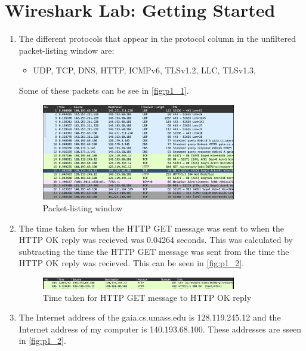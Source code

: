 \documentclass{article}
\begin{document}
\section{Wireshark Lab: Getting Started}
\begin{enumerate}
    \item The different protocols that appear in the protocol column in the unfiltered packet-listing window are:
    \begin{itemize}
        \item UDP, TCP, DNS, HTTP, ICMPv6, TLSv1.2, LLC, TLSv1.3,
    \end{itemize}

    Some of these packets can be see in \autoref{fig:p1_1}.

    \begin{figure}[ht!]
        \centering
        \includegraphics[width=0.8\textwidth]{p1_1}
        \caption{Packet-listing window}
        \label{fig:p1_1}
    \end{figure}


    \item The time taken for when the HTTP GET message was sent to when the HTTP OK reply was recieved was 0.04264 seconds. This was calculated by subtracting the time the HTTP GET message was sent from the time the HTTP OK reply was recieved. This can be seen in \autoref{fig:p1_2}.

    \begin{figure}[ht!]
        \centering
        \includegraphics[width=0.8\textwidth]{p1_2}
        \caption{Time taken for HTTP GET message to HTTP OK reply}
        \label{fig:p1_2}
    \end{figure}

    \item The Internet address of the gaia.cs.umass.edu is 128.119.245.12 and the Internet address of my computer is 140.193.68.100. These addresses are sseen in \autoref{fig:p1_2}.
    

\end{enumerate}
\end{document}
